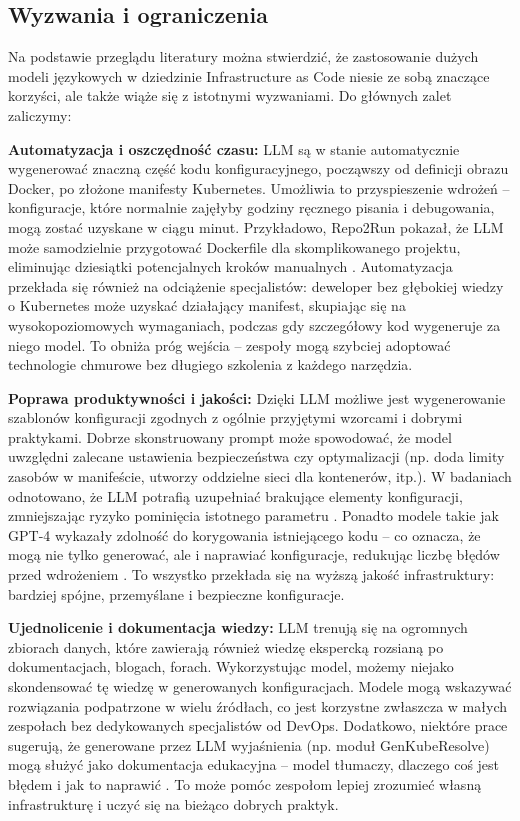 \subsection{Wyzwania i ograniczenia}

Na podstawie przeglądu literatury można stwierdzić, że zastosowanie dużych modeli językowych w dziedzinie Infrastructure as Code niesie ze sobą znaczące korzyści, ale także wiąże się z istotnymi wyzwaniami. Do głównych zalet zaliczymy:

\textbf{Automatyzacja i oszczędność czasu:} LLM są w stanie automatycznie wygenerować znaczną część kodu konfiguracyjnego, począwszy od definicji obrazu Docker, po złożone manifesty Kubernetes. Umożliwia to przyspieszenie wdrożeń – konfiguracje, które normalnie zajęłyby godziny ręcznego pisania i debugowania, mogą zostać uzyskane w ciągu minut. Przykładowo, Repo2Run pokazał, że LLM może samodzielnie przygotować Dockerfile dla skomplikowanego projektu, eliminując dziesiątki potencjalnych kroków manualnych \cite{hu_llm-based_2025}. Automatyzacja przekłada się również na odciążenie specjalistów: deweloper bez głębokiej wiedzy o Kubernetes może uzyskać działający manifest, skupiając się na wysokopoziomowych wymaganiach, podczas gdy szczegółowy kod wygeneruje za niego model. To obniża próg wejścia – zespoły mogą szybciej adoptować technologie chmurowe bez długiego szkolenia z każdego narzędzia.

\textbf{Poprawa produktywności i jakości:} Dzięki LLM możliwe jest wygenerowanie szablonów konfiguracji zgodnych z ogólnie przyjętymi wzorcami i dobrymi praktykami. Dobrze skonstruowany prompt może spowodować, że model uwzględni zalecane ustawienia bezpieczeństwa czy optymalizacji (np. doda limity zasobów w manifeście, utworzy oddzielne sieci dla kontenerów, itp.). W badaniach odnotowano, że LLM potrafią uzupełniać brakujące elementy konfiguracji, zmniejszając ryzyko pominięcia istotnego parametru \cite{kratzke_dont_2024}. Ponadto modele takie jak GPT-4 wykazały zdolność do korygowania istniejącego kodu – co oznacza, że mogą nie tylko generować, ale i naprawiać konfiguracje, redukując liczbę błędów przed wdrożeniem \cite{low_repairing_2024}. To wszystko przekłada się na wyższą jakość infrastruktury: bardziej spójne, przemyślane i bezpieczne konfiguracje.

\textbf{Ujednolicenie i dokumentacja wiedzy:} LLM trenują się na ogromnych zbiorach danych, które zawierają również wiedzę ekspercką rozsianą po dokumentacjach, blogach, forach. Wykorzystując model, możemy niejako skondensować tę wiedzę w generowanych konfiguracjach. Modele mogą wskazywać rozwiązania podpatrzone w wielu źródłach, co jest korzystne zwłaszcza w małych zespołach bez dedykowanych specjalistów od DevOps. Dodatkowo, niektóre prace sugerują, że generowane przez LLM wyjaśnienia (np. moduł GenKubeResolve) mogą służyć jako dokumentacja edukacyjna – model tłumaczy, dlaczego coś jest błędem i jak to naprawić \cite{malul_genkubesec_2024}. To może pomóc zespołom lepiej zrozumieć własną infrastrukturę i uczyć się na bieżąco dobrych praktyk.

